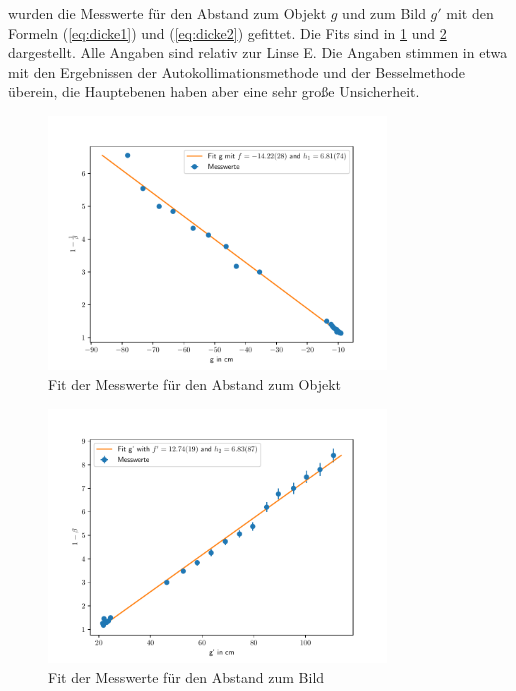 \documentclass[11pt, a4paper]{article}
\begin{document}
    wurden die Messwerte für den Abstand zum Objekt $g$ und zum Bild $g'$ mit den Formeln (\ref{eq:dicke1}) und (\ref{eq:dicke2}) gefittet. Die Fits sind in \ref{fig:fit1} und \ref{fig:fit2} dargestellt. Alle Angaben sind relativ zur Linse E. Die Angaben stimmen in etwa mit den Ergebnissen der Autokollimationsmethode und der Besselmethode überein, die Hauptebenen haben aber eine sehr große Unsicherheit.

    \begin{figure}[h]
        \centering
        \includegraphics[width=0.8\textwidth]{g.pdf}
        \caption{Fit der Messwerte für den Abstand zum Objekt}
        \label{fig:fit1}
    \end{figure}

    \begin{figure}[h]
        \centering
        \includegraphics[width=0.8\textwidth]{g_prime.pdf}
        \caption{Fit der Messwerte für den Abstand zum Bild}
        \label{fig:fit2}
    \end{figure}
\end{document}
